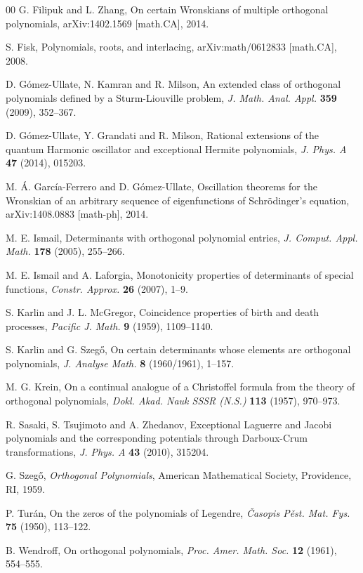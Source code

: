 \documentclass[10pt]{article}
\theoremstyle{plain}
\theoremstyle{definition}
\numberwithin{equation}{section} %
\begin{document}
\begin{thebibliography}{00}
G. Filipuk and L. Zhang,
On certain Wronskians of multiple orthogonal polynomials,
arXiv:1402.1569 [math.CA], 2014.

S. Fisk,
Polynomials, roots, and interlacing,
arXiv:math/0612833 [math.CA], 2008.

D. G\'omez-Ullate, N. Kamran and R. Milson,
An extended class of orthogonal polynomials defined by a Sturm-Liouville problem,
\textit{J. Math. Anal. Appl.} \textbf{359} (2009), 352--367.

D. G\'omez-Ullate, Y. Grandati and R. Milson,
Rational extensions of the quantum Harmonic oscillator and exceptional Hermite polynomials,
\textit{J. Phys. A} \textbf{47} (2014), 015203.

M. \'A. Garc\'ia-Ferrero and D. G\'omez-Ullate,
Oscillation theorems for the Wronskian of an arbitrary sequence of eigenfunctions of Schr\"odinger's equation,
arXiv:1408.0883 [math-ph], 2014.

M. E. Ismail,
Determinants with orthogonal polynomial entries,
\textit{J. Comput. Appl. Math.} \textbf{178} (2005), 255--266.

M. E. Ismail and A. Laforgia,
Monotonicity properties of determinants of special functions,
\textit{Constr. Approx.} \textbf{26} (2007), 1--9.

S. Karlin and J. L. McGregor,
Coincidence properties of birth and death processes,
\textit{Pacific J. Math.} \textbf{9} (1959), 1109--1140.

S. Karlin and G. Szeg\H{o},
On certain determinants whose elements are orthogonal polynomials,
\textit{J. Analyse Math.} \textbf{8} (1960/1961), 1--157.

M. G. Krein,
On a continual analogue of a Christoffel formula from the theory of orthogonal polynomials,
\textit{Dokl. Akad. Nauk SSSR (N.S.)} \textbf{113} (1957), 970--973.

R. Sasaki, S. Tsujimoto and A. Zhedanov,
Exceptional Laguerre and Jacobi polynomials and the corresponding potentials through Darboux-Crum transformations,
\textit{J. Phys. A} \textbf{43} (2010), 315204.

G. Szeg\H{o},
\textit{Orthogonal Polynomials},
American Mathematical Society, Providence, RI, 1959.

P. Tur\'an,
On the zeros of the polynomials of Legendre,
\textit{\v{C}asopis P\v{e}st. Mat. Fys.} \textbf{75} (1950), 113--122.

B. Wendroff,
On orthogonal polynomials,
\textit{Proc. Amer. Math. Soc.} \textbf{12} (1961), 554--555.

\end{thebibliography}

\end{document}
